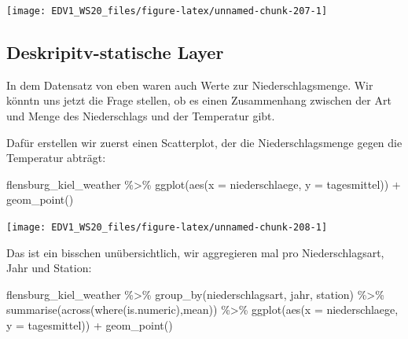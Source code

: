 \documentclass[
]{book}
\newenvironment{Shaded}{\begin{snugshade}}{\end{snugshade}}
\newcommand{\AttributeTok}[1]{\textcolor[rgb]{0.77,0.63,0.00}{#1}}
\newcommand{\FunctionTok}[1]{\textcolor[rgb]{0.00,0.00,0.00}{#1}}
\newcommand{\NormalTok}[1]{#1}
\newcommand{\SpecialCharTok}[1]{\textcolor[rgb]{0.00,0.00,0.00}{#1}}
\begin{document}
\begin{center}\texttt{[image: EDV1\_WS20\_files/figure-latex/unnamed-chunk-207-1]} \end{center}

\hypertarget{deskripitv-statische-layer}{%
\subsection{Deskripitv-statische Layer}\label{deskripitv-statische-layer}}

In dem Datensatz von eben waren auch Werte zur Niederschlagsmenge. Wir könntn uns jetzt die Frage stellen, ob es einen Zusammenhang zwischen der Art und Menge des Niederschlags und der Temperatur gibt.

Dafür erstellen wir zuerst einen Scatterplot, der die Niederschlagsmenge gegen die Temperatur abträgt:

\begin{Shaded}
\begin{Highlighting}[]
\NormalTok{flensburg\_kiel\_weather }\SpecialCharTok{\%\textgreater{}\%} 
  \FunctionTok{ggplot}\NormalTok{(}\FunctionTok{aes}\NormalTok{(}\AttributeTok{x =}\NormalTok{ niederschlaege, }
             \AttributeTok{y =}\NormalTok{ tagesmittel)) }\SpecialCharTok{+}
  \FunctionTok{geom\_point}\NormalTok{() }
\end{Highlighting}
\end{Shaded}

\begin{center}\texttt{[image: EDV1\_WS20\_files/figure-latex/unnamed-chunk-208-1]} \end{center}

Das ist ein bisschen unübersichtlich, wir aggregieren mal pro Niederschlagsart, Jahr und Station:

\begin{Shaded}
\begin{Highlighting}[]
\NormalTok{flensburg\_kiel\_weather }\SpecialCharTok{\%\textgreater{}\%} 
  \FunctionTok{group\_by}\NormalTok{(niederschlagsart, jahr, station) }\SpecialCharTok{\%\textgreater{}\%} 
  \FunctionTok{summarise}\NormalTok{(}\FunctionTok{across}\NormalTok{(}\FunctionTok{where}\NormalTok{(is.numeric),mean)) }\SpecialCharTok{\%\textgreater{}\%} 
  \FunctionTok{ggplot}\NormalTok{(}\FunctionTok{aes}\NormalTok{(}\AttributeTok{x =}\NormalTok{ niederschlaege, }
             \AttributeTok{y =}\NormalTok{ tagesmittel)) }\SpecialCharTok{+}
  \FunctionTok{geom\_point}\NormalTok{()}
\end{Highlighting}
\end{Shaded}
\end{document}
